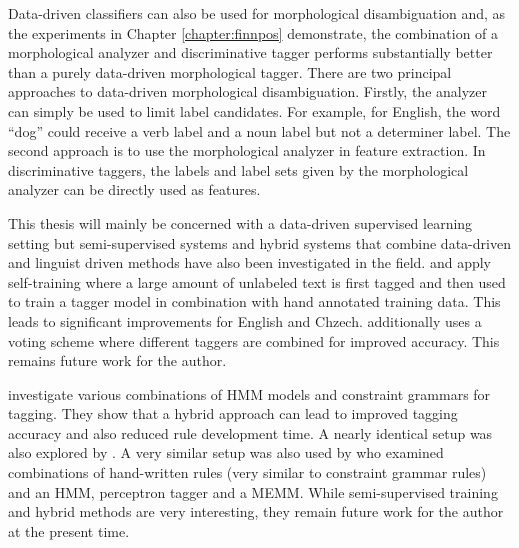 Data-driven classifiers can also be used for morphological
disambiguation and, as the experiments in Chapter
\ref{chapter:finnpos} demonstrate, the combination of a morphological
analyzer and discriminative tagger performs substantially better than
a purely data-driven morphological tagger. There are two principal
approaches to data-driven morphological disambiguation. Firstly, the
analyzer can simply be used to limit label candidates. For example,
for English, the word ``dog'' could receive a verb label and a noun
label but not a determiner label. The second approach is to use the
morphological analyzer in feature extraction. In discriminative
taggers, the labels and label sets given by the morphological analyzer
can be directly used as features.

This thesis will mainly be concerned with a data-driven supervised
learning setting but semi-supervised systems and hybrid systems that
combine data-driven and linguist driven methods have also been
investigated in the field. \cite{Spoustova2009} and \cite{Sogaard2011}
apply self-training where a large amount of unlabeled text is first
tagged and then used to train a tagger model in combination with hand
annotated training data. This leads to significant improvements for
English and Chzech. \cite{Spoustova2009} additionally uses a voting
scheme where different taggers are combined for improved
accuracy. This remains future work for the author.

\cite{Hulden2012} investigate various combinations of HMM models and
constraint grammars for tagging. They show that a hybrid approach can
lead to improved tagging accuracy and also reduced rule development
time. A nearly identical setup was also explored by
\cite{Orosz2013}. A very similar setup was also used by
\cite{Spoustova2007} who examined combinations of hand-written rules
(very similar to constraint grammar rules) and an HMM, perceptron
tagger and a MEMM. While semi-supervised training and hybrid methods are very
interesting, they remain future work for the author at the present
time. %

